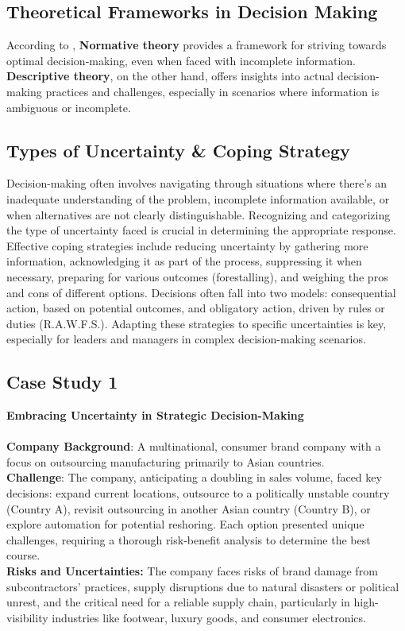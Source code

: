 \documentclass{article}
\begin{document}
\subsection{Theoretical Frameworks in Decision Making}
According to \cite{ahmed2012theories}, \textbf{Normative theory} provides a framework for striving towards optimal decision-making, even when faced with incomplete information. \textbf{Descriptive theory}, on the other hand, offers insights into actual decision-making practices and challenges, especially in scenarios where information is ambiguous or incomplete.


\subsection{Types of Uncertainty \& Coping Strategy }
Decision-making often involves navigating through situations where there's an inadequate understanding of the problem, incomplete information available, or when alternatives are not clearly distinguishable. Recognizing and categorizing the type of uncertainty faced is crucial in determining the appropriate response.\cite{LIPSHITZ1997149}
\newline \newline
Effective coping strategies include reducing uncertainty by gathering more information, acknowledging it as part of the process, suppressing it when necessary, preparing for various outcomes (forestalling), and weighing the pros and cons of different options. Decisions often fall into two models: consequential action, based on potential outcomes, and obligatory action, driven by rules or duties (R.A.W.F.S.). Adapting these strategies to specific uncertainties is key, especially for leaders and managers in complex decision-making scenarios.
\subsection{Case Study 1}
\textbf{Embracing Uncertainty in Strategic Decision-Making}\cite{taghavifard2009decision}
\\
\\
\textbf{Company Background}: A multinational, consumer brand company with a focus on outsourcing manufacturing primarily to Asian countries.
\\
\textbf{Challenge}: The company, anticipating a doubling in sales volume, faced key decisions: expand current locations, outsource to a politically unstable country (Country A), revisit outsourcing in another Asian country (Country B), or explore automation for potential reshoring. Each option presented unique challenges, requiring a thorough risk-benefit analysis to determine the best course.
\\
\textbf{Risks and Uncertainties:}
The company faces risks of brand damage from subcontractors' practices, supply disruptions due to natural disasters or political unrest, and the critical need for a reliable supply chain, particularly in high-visibility industries like footwear, luxury goods, and consumer electronics. 
\end{document}
